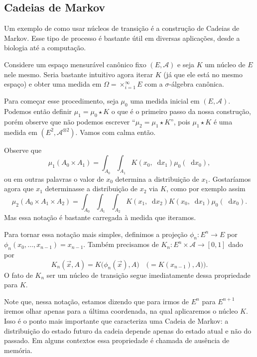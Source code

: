 \documentclass[reqno]{article}
\newcommand*\1{\mathds{1}}
\renewcommand*\d{\mathop{}\!\mathrm{d}}
\begin{document}
\subsection{Cadeias de Markov}

Um exemplo de como usar núcleos de transição é a construção de Cadeias de Markov.
Esse tipo de processo é bastante útil em diversas aplicações, desde a biologia até a computação.

Considere um espaço mensurável canônico fixo $(E, \mathcal{A})$ e seja $K$ um núcleo de $E$ nele mesmo.
Seria bastante intuitivo agora iterar $K$ (já que ele está no mesmo espaço) e obter uma medida em $\Omega = \times_{i=1}^\infty E$ com a $\sigma$-álgebra canônica.

Para começar esse procedimento, seja $\mu_0$ uma medida inicial em $(E, \mathcal{A})$.
Podemos então definir $\mu_1 = \mu_0 \star K$ o que é o primeiro passo da nossa construção, porém observe que não podemos escrever ``$\mu_2 = \mu_1 \star K$'', pois $\mu_1 \star K$ é uma medida em $(E^2, \mathcal{A}^{\otimes 2})$.
Vamos com calma então.

Observe que
\begin{equation}
  \mu_1(A_0 \times A_1) = \int_{A_0} \int_{A_1} K(x_0, \d x_1) \mu_0(\d x_0),
\end{equation}
ou em outras palavras o valor de $x_0$ determina a distribuição de $x_1$.
Gostaríamos agora que $x_1$ determinasse a distribuição de $x_2$ via $K$, como por exemplo assim
\begin{equation}
  \mu_2(A_0 \times A_1 \times A_2) = \int_{A_0} \int_{A_1} \int_{A_2} K(x_1, \d x_2) K(x_0, \d x_1) \mu_0 (\d x_0).
\end{equation}
Mas essa notação é bastante carregada à medida que iteramos.

Para tornar essa notação mais simples, definimos a projeção $\phi_n:E^n \to E$ por $\phi_n(x_0, \dots, x_{n-1}) = x_{n-1}$.
Também precisamos de $K_n: E^n \times \mathcal{A} \to [0,1]$ dado por
\begin{equation}
  K_n(\vec{x},A) = K\big(\phi_n(\vec{x}), A\big) \quad \big(= K(x_{n-1}),A) \big).
\end{equation}
O fato de $K_n$ ser um núcleo de transição segue imediatamente dessa propriedade para $K$.

Note que, nessa notação, estamos dizendo que para irmos de $E^n$ para $E^{n+1}$ iremos olhar apenas para a última coordenada, na qual aplicaremos o núcleo $K$.
Isso é o ponto mais importante que caracteriza uma Cadeia de Markov: a distribuição do estado futuro da cadeia depende apenas do estado atual e não do passado.
Em alguns contextos essa propriedade é chamada de ausência de memória.
\end{document}
